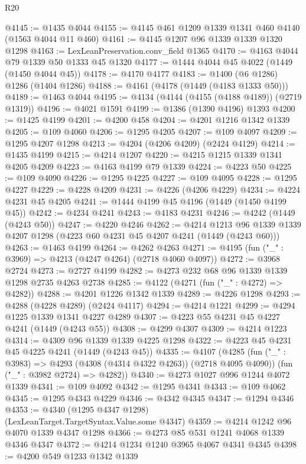 \begin{lexlean}{R20}
\begin{coremodule}
@4145 := @1435 @4044
@4155 := @4145 @461 @1209 @1339 @1341 @460 @4140 (@1563 @4044 @11 @460)
@4161 := @4145 @1207 @96 @1339 @1339 @1320 @1298
@4163 := LexLeanPreservation.conv_field @1365
@4170 := @4163 @4044 @79 @1339 @50 @1333 @45 @1320
@4177 := @1444 @4044 @45 @4022 (@1449 (@1450 @4044 @45))
@4178 := @4170 @4177
@4183 := @1400 (@6 @1286) @1286 (@1404 @1286)
@4188 := @4161 (@4178 (@1449 (@4183 @1333 @50)))
@4189 := @1463 @4044
@4195 := @4134 (@4144 (@4155 (@4188 @4189)) (@2719 @1319))
@4196 := @4021 @1591
@4199 := @1386 (@1390 @4196) @1393
@4200 := @1425 @4199
@4201 := @4200 @458
@4204 := @4201 @1216 @1342 @1339
@4205 := @109 @4060
@4206 := @1295 @4205
@4207 := @109 @4097
@4209 := @1295 @4207 @1298
@4213 := @4204 (@4206 @4209) (@2424 @4129)
@4214 := @1435 @4199
@4215 := @4214 @1207
@4220 := @4215 @1215 @1339 @1341 @4205 @4209
@4223 := @4163 @4199 @79 @1339
@4224 := @4223 @50
@4225 := @109 @4090
@4226 := @1295 @4225
@4227 := @109 @4095
@4228 := @1295 @4227
@4229 := @4228 @4209
@4231 := @4226 (@4206 @4229)
@4234 := @4224 @4231 @45 @4205
@4241 := @1444 @4199 @45 @4196 (@1449 (@1450 @4199 @45))
@4242 := @4234 @4241
@4243 := @4183 @4231
@4246 := @4242 (@1449 (@4243 @50))
@4247 := @4220 @4246
@4262 := @4214
    @1213
    @96
    @1339
    @1339
    @4207
    @1298
    (@4223 @60 @4231 @45 @4207 @4241 (@1449 (@4243 @60)))
@4263 := @1463 @4199
@4264 := @4262 @4263
@4271 := @4195 (fun ("_" : @3969) => @4213 (@4247 @4264) (@2718 @4060 @4097))
@4272 := @3968 @2724
@4273 := @2727 @4199
@4282 := @4273 @232 @68 @96 @1339 @1339 @1298 @2735 @4263 @2738
@4285 := @4122 (@4271 (fun ("_" : @4272) => @4282))
@4288 := @4201 @1226 @1342 @1339
@4289 := @4226 @1298
@4293 := @4288 (@4228 @4289) (@2424 @4117)
@4294 := @4214 @1221
@4299 := @4294 @1225 @1339 @1341 @4227 @4289
@4307 := @4223 @55 @4231 @45 @4227 @4241 (@1449 (@4243 @55))
@4308 := @4299 @4307
@4309 := @4214 @1223
@4314 := @4309 @96 @1339 @1339 @4225 @1298
@4322 := @4223 @45 @4231 @45 @4225 @4241 (@1449 (@4243 @45))
@4335 := @4107
    (@4285
      (fun ("_" : @3983) => @4293 (@4308 (@4314 @4322 @4263)) (@2718 @4095 @4090))
      (fun ("_" : @3982 @2724) => @4282))
@4340 := @4273 @1027 @996 @1244 @4072 @1339
@4341 := @109 @4092
@4342 := @1295 @4341
@4343 := @109 @4062
@4345 := @1295 @4343 @4229
@4346 := @4342 @4345
@4347 := @1294 @4346
@4353 := @4340 (@1295 @4347 @1298) (LexLeanTarget.TargetSyntax.Value.some @4347)
@4359 := @4214 @1242 @96 @4070 @1339 @4347 @1298
@4366 := @4273 @85 @531 @1241 @4068 @1339 @4346 @4347
@4372 := @4214 @1234 @1240 @3965 @4067 @4341 @4345
@4398 := @4200
    @549
    @1233
    @1342
    @1339

\end{coremodule}
\end{lexlean}
